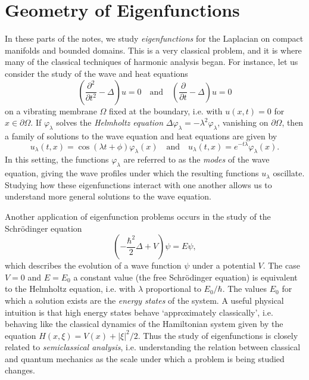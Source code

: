 
\part{Geometry of Eigenfunctions}



In these parts of the notes, we study \emph{eigenfunctions} for the Laplacian on compact manifolds and bounded domains. This is a very classical problem, and it is where many of the classical techniques of harmonic analysis began. For instance, let us consider the study of the wave and heat equations
%
\[ \left( \frac{\partial^2}{\partial t^2} - \Delta \right) u = 0 \quad\text{and}\quad \left( \frac{\partial}{\partial t} - \Delta \right) u = 0 \]
%
on a vibrating membrane $\Omega$ fixed at the boundary, i.e. with $u(x,t) = 0$ for $x \in \partial \Omega$. If $\varphi_\lambda$ solves the \emph{Helmholtz equation} $\Delta \varphi_\lambda = - \lambda^2 \varphi_\lambda$, vanishing on $\partial \Omega$, then a family of solutions to the wave equation and heat equations are given by
%
\[ u_\lambda(t,x) = \cos(\lambda t + \phi) \varphi_\lambda(x) \quad\text{and}\quad u_\lambda(t,x) = e^{-t \lambda} \varphi_\lambda(x). \]
%
In this setting, the functions $\varphi_\lambda$ are referred to as the \emph{modes} of the wave equation, giving the wave profiles under which the resulting functions $u_\lambda$ oscillate. Studying how these eigenfunctions interact with one another allows us to understand more general solutions to the wave equation.

Another application of eigenfunction problems occurs in the study of the Schr\"{o}dinger equation
%
\[ \left( - \frac{\hbar^2}{2} \Delta + V \right) \psi = E \psi, \]
%
which describes the evolution of a wave function $\psi$ under a potential $V$. The case $V = 0$ and $E = E_0$ a constant value (the free Schr\"{o}dinger equation) is equivalent to the Helmholtz equation, i.e. with $\lambda$ proportional to $E_0 / \hbar$. The values $E_0$ for which a solution exists are the \emph{energy states} of the system. A useful physical intuition is that high energy states behave `approximately classically', i.e. behaving like the classical dynamics of the Hamiltonian system given by the equation $H(x,\xi) = V(x) + |\xi|^2 / 2$. Thus the study of eigenfunctions is closely related to \emph{semiclassical analysis}, i.e. understanding the relation between classical and quantum mechanics as the scale under which a problem is being studied changes.

